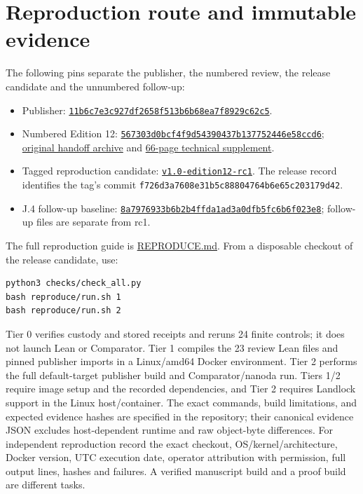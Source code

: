 \documentclass[11pt,letterpaper]{article}
\theoremstyle{definition}\newtheorem{definition}[theorem]{Definition}\newtheorem{example}[theorem]{Example}
\theoremstyle{remark}\newtheorem{remark}[theorem]{Remark}
\newcommand{\aud}[2]{\href{https://github.com/nousentllc/VP-VNP-Review/blob/567303d0bcf4f9d54390437b137752446e58ccd6/#1}{#2}}
\newcommand{\follow}[2]{\href{https://github.com/nousentllc/VP-VNP-Review/blob/8a7976933b6b2b4ffda1ad3a0dfb5fc6b6f023e8/#1}{#2}}
\begin{document}
\appendix
\section{Reproduction route and immutable evidence}\label{sec:repro}
The following pins separate the publisher, the numbered review, the release candidate and the unnumbered follow-up:
\begin{itemize}[leftmargin=1.7em]
\item Publisher: \href{https://github.com/anthropics/formal-math/tree/11b6c7e3c927df2658f513b6b68ea7f8929c62c5/vp-vnp}{\nolinkurl{11b6c7e3c927df2658f513b6b68ea7f8929c62c5}}.
\item Numbered Edition 12: \href{https://github.com/nousentllc/VP-VNP-Review/tree/567303d0bcf4f9d54390437b137752446e58ccd6}{\nolinkurl{567303d0bcf4f9d54390437b137752446e58ccd6}}; \aud{handoff/VP_VNP_Review_2026-11-25_pass15.zip}{original handoff archive} and \aud{report/VP_VNP_Research_Review.pdf}{66-page technical supplement}.
\item Tagged reproduction candidate: \href{https://github.com/nousentllc/VP-VNP-Review/tree/v1.0-edition12-rc1}{\texttt{v1.0-edition12-rc1}}. The release record identifies the tag's commit \nolinkurl{f726d3a7608e31b5c88804764b6e65c203179d42}.
\item J.4 follow-up baseline: \href{https://github.com/nousentllc/VP-VNP-Review/tree/8a7976933b6b2b4ffda1ad3a0dfb5fc6b6f023e8}{\nolinkurl{8a7976933b6b2b4ffda1ad3a0dfb5fc6b6f023e8}}; follow-up files are separate from rc1.
\end{itemize}
The full reproduction guide is \follow{REPRODUCE.md}{REPRODUCE.md}. From a disposable checkout of the release candidate, use:
\begin{verbatim}
python3 checks/check_all.py
bash reproduce/run.sh 1
bash reproduce/run.sh 2
\end{verbatim}
Tier 0 verifies custody and stored receipts and reruns 24 finite controls; it does not launch Lean or Comparator. Tier 1 compiles the 23 review Lean files and pinned publisher imports in a Linux/amd64 Docker environment. Tier 2 performs the full default-target publisher build and Comparator/nanoda run. Tiers 1/2 require image setup and the recorded dependencies, and Tier 2 requires Landlock support in the Linux host/container. The exact commands, build limitations, and expected evidence hashes are specified in the repository; their canonical evidence JSON excludes host-dependent runtime and raw object-byte differences. For independent reproduction record the exact checkout, OS/kernel/architecture, Docker version, UTC execution date, operator attribution with permission, full output lines, hashes and failures. A verified manuscript build and a proof build are different tasks.
\end{document}
